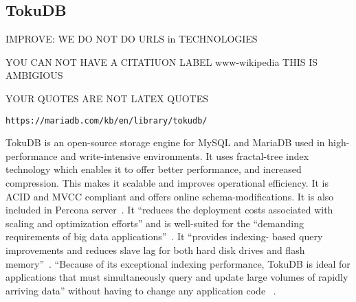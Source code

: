 \subsection{TokuDB}

IMPROVE: WE DO NOT DO URLS in TECHNOLOGIES

YOU CAN NOT HAVE A CITATIUON LABEL www-wikipedia THIS IS AMBIGIOUS

YOUR QUOTES ARE NOT LATEX QUOTES

\verb|https://mariadb.com/kb/en/library/tokudb/|
 
TokuDB is an open-source storage engine for MySQL and MariaDB used in high-
performance and write-intensive environments. It uses fractal-tree index 
technology which enables it to offer better performance, and increased compression. 
This makes it scalable and improves operational efficiency. It is ACID and MVCC 
compliant and offers online schema-modifications. It is also included in Percona 
server~\cite{hid-sp18-516-www-wikipedia}. It ``reduces the deployment costs associated with 
scaling and optimization efforts'' and is well-suited for the ``demanding requirements 
of big data applications''~\cite{hid-sp18-516-www-percona}. It ``provides indexing-
based query improvements and reduces slave lag for both hard disk drives and flash 
memory''~\cite{hid-sp18-516-www-wikipedia}. ``Because of its exceptional indexing performance, 
TokuDB is ideal for applications that must simultaneously query and update large 
volumes of rapidly arriving data'' without having to change any application code
~\cite{hid-sp18-516-blackbird-si}.

